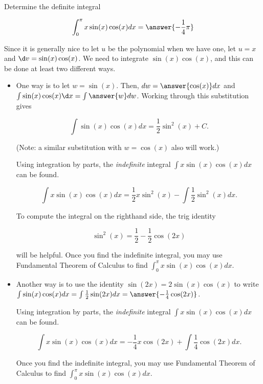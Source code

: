 \documentclass{ximera}
\author{Jason Miller and Jim Talamo}
\begin{document}
\begin{exercise}
Determine the definite integral 

\[
\int_0^{\pi} x\sin(x) \cos(x) dx = \answer{-\frac{1}{4} \pi}
\]

\begin{hint}
Since it is generally nice to let $u$ be the polynomial when we have one, let $u = x$ and $\d v = \sin(x) \cos(x)$.  We need to integrate $\sin(x) \cos(x)$, and this can be done at least two different ways.

\begin{itemize}
\item One way is to let $w=\sin(x)$.  Then, $dw = \answer{\cos(x)} dx$ and $\int \sin(x) \cos(x) \d x = \int \answer{w} dw$.  Working through this substitution gives

\[
\int \sin(x) \cos(x) dx = \frac{1}{2}\sin^2(x)+C.
\]
 
(Note: a similar substitution with $w=\cos(x)$ also will work.)

Using integration by parts, the \emph{indefinite} integral $\int x\sin(x) \cos(x) dx$ can be found.

\[
\int x\sin(x) \cos(x) dx =\frac{1}{2}x\sin^2(x) - \int \frac{1}{2} \sin^2(x) dx. 
\]

To compute the integral on the righthand side, the trig identity

\[
\sin^2(x) = \frac{1}{2} - \frac{1}{2} \cos(2x)
\] 

will be helpful.  Once you find the indefinite integral, you may use Fundamental Theorem of Calculus to find $\int_0^{\pi} x\sin(x) \cos(x) dx $.

 \item Another way is to use the identity $\sin(2x) = 2 \sin(x)\cos(x)$ to write $\int  \sin(x)\cos(x) dx = \int \frac{1}{2} \sin(2x) dx = \answer{-\frac{1}{4}\cos(2x)}$.

Using integration by parts, the \emph{indefinite} integral $\int x\sin(x) \cos(x) dx$ can be found.

\[
\int x\sin(x) \cos(x) dx =-\frac{1}{4}x\cos(2x) + \int \frac{1}{4} \cos(2x) dx. 
\]

Once you find the indefinite integral, you may use Fundamental Theorem of Calculus to find $\int_0^{\pi} x\sin(x) \cos(x) dx $.

\end{itemize}
 
\end{hint}


\end{exercise}
\end{document}
